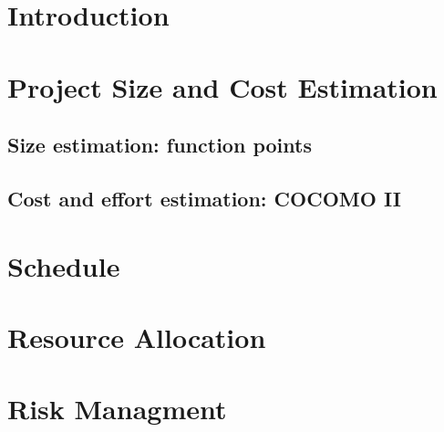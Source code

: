 \documentclass{article}
\begin{document}
\section{Introduction}

\section{Project Size and Cost Estimation}
\subsection{Size estimation: function points}

\subsection{Cost and effort estimation: COCOMO II}

\section{Schedule}

\section{Resource Allocation}

\section{Risk Managment}
\end{document}
